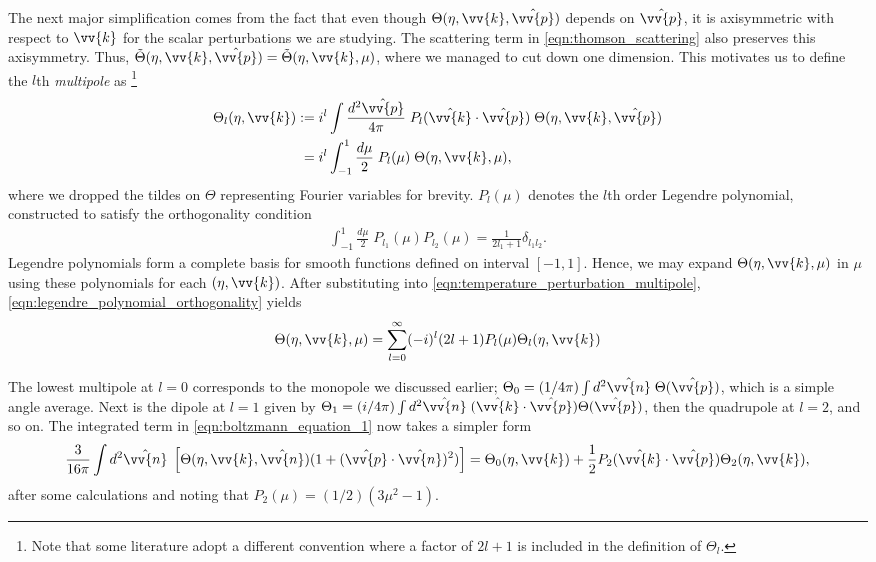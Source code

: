 \documentclass[a4paper,12pt,times,custombib,print,index]{Classes/PhDThesisPSnPDF} %
\begin{document}
The next major simplification comes from the fact that even though $\Theta(\eta,\vv{k},\hat{\vv{p}})$ depends on $\hat{\vv{p}}$, it is axisymmetric with respect to $\vv{k}$ for the scalar perturbations we are studying. The scattering term in \eqref{eqn:thomson_scattering} also preserves this axisymmetry. Thus, $\tilde{\Theta}(\eta,\vv{k},\hat{\vv{p}}) = \tilde{\Theta}(\eta,\vv{k},\mu)$, where we managed to cut down one dimension. This motivates us to define the $l$th \textit{multipole} as \footnote{Note that some literature adopt a different convention where a factor of $2l+1$ is included in the definition of $\Theta_l$.}
\begin{align}
	\Theta_l (\eta,\vv{k}) :=& \; i^l \int \frac{d^2 \hat{\vv{p}}}{4\pi} \; P_l (\hat{\vv{k}} \cdot \hat{\vv{p}}) \; \Theta(\eta, \vv{k}, \hat{\vv{p}}) \\
	=& \; i^l \int^1_{-1} \frac{d\mu}{2} \; P_l (\mu) \; \Theta(\eta, \vv{k}, \mu), \label{eqn:temperature_perturbation_multipole} 
\end{align}
where we dropped the tildes on $\Theta$ representing Fourier variables for brevity. $P_l(\mu)$ denotes the $l$th order Legendre polynomial, constructed to satisfy the orthogonality condition
\begin{align}
	\int_{-1}^{1} \frac{d\mu}{2} \; P_{l_1}(\mu) P_{l_2}(\mu) = \frac{1}{2l_1 + 1} \delta_{l_1 l_2}. \label{eqn:legendre_polynomial_orthogonality}
\end{align}
Legendre polynomials form a complete basis for smooth functions defined on interval $[-1,1]$. Hence, we may expand $\Theta(\eta,\vv{k},\mu)$ in $\mu$ using these polynomials for each $(\eta,\vv{k})$. After substituting into \eqref{eqn:temperature_perturbation_multipole}, \eqref{eqn:legendre_polynomial_orthogonality} yields
\begin{align}
	\Theta(\eta,\vv{k},\mu) = \sum_{l=0}^{\infty} (-i)^l (2l+1) P_l (\mu) \Theta_l (\eta, \vv{k}) \label{eqn:temperature_perturbation_legendre_expansion}
\end{align}

The lowest multipole at $l=0$ corresponds to the monopole we discussed earlier; $\Theta_0 = (1/4\pi) \int d^2\hat{\vv{n}} \; \Theta(\hat{\vv{p}})$, which is a simple angle average. Next is the dipole at $l=1$ given by $\Theta_1 = (i/4\pi) \int d^2\hat{\vv{n}} \; (\hat{\vv{k}} \cdot \hat{\vv{p}}) \Theta(\hat{\vv{p}})$, then the quadrupole at $l=2$, and so on. The integrated term in \eqref{eqn:boltzmann_equation_1} now takes a simpler form
\begin{align}
	\frac{3}{16\pi} \int d^2\hat{\vv{n}} \; \left[ \Theta(\eta,\vv{k},\hat{\vv{n}}) (1 + (\hat{\vv{p}} \cdot \hat{\vv{n}})^2) \right] = \Theta_0 (\eta,\vv{k}) + \frac{1}{2} P_2 (\hat{\vv{k}} \cdot \hat{\vv{p}}) \Theta_2(\eta, \vv{k}), 
\end{align}
after some calculations and noting that $P_2(\mu) = (1/2)(3\mu^2 -1)$.
\end{document}
